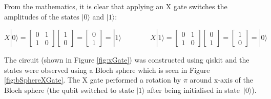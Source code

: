 From the mathematics, it is clear that applying an X gate switches the amplitudes of the states $|0\rangle$ and $|1\rangle$:

$$ X|0\rangle = \begin{bmatrix} 0 & 1 \\ 1 & 0 \end{bmatrix}\begin{bmatrix} 1 \\ 0 \end{bmatrix} = \begin{bmatrix} 0 \\ 1 \end{bmatrix} = |1\rangle \quad\quad\quad\quad
X|1\rangle = \begin{bmatrix} 0 & 1 \\ 1 & 0 \end{bmatrix}\begin{bmatrix} 0 \\ 1 \end{bmatrix} = \begin{bmatrix} 1 \\ 0 \end{bmatrix} = |0\rangle$$

The circuit (shown in Figure \ref{fig:xGate}) was constructed using qiskit and the states were observed using a Bloch sphere which is seen in Figure \ref{fig:bSphereXGate}. The X gate performed a rotation by $\pi$ around x-axis of the Bloch sphere (the qubit switched to state $|1\rangle$ after being initialised in state~$|0\rangle$).

